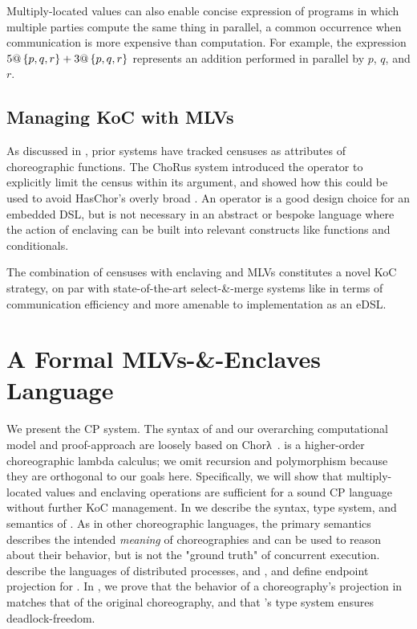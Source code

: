 Multiply-located values can also enable concise expression of programs in which multiple parties compute the same thing in parallel,
a common occurrence when communication is more expensive than computation.
For example, the \HLSCentral expression $5@\left\{p,q,r\right\}+3@\left\{p,q,r\right\}$ represents an addition performed in parallel by $p$, $q$, and $r$.

\subsection{Managing KoC with MLVs}
\label{sec:enclaves}

As discussed in , prior systems have tracked censuses as attributes of choreographic functions.
The ChoRus system introduced the  operator to explicitly limit the census within its argument,
and showed how this could be used to avoid HasChor's overly broad .
An  operator is a good design choice for an embedded DSL,
but is not necessary in an abstract or bespoke language where the action of enclaving can be built into relevant constructs like
functions and conditionals.

The combination of censuses with enclaving and MLVs constitutes a novel KoC strategy,
on par with state-of-the-art select-\&-merge systems like \chorLambda in terms of communication efficiency
and more amenable to implementation as an eDSL.


\section{A Formal MLVs-\&-Enclaves Language}\label{sec:more-formalism}


We present the \HLSCentral CP system.
The syntax of \HLSCentral and our overarching computational model and proof-approach are loosely based on
Chorλ~\cite{chor-lambda}.
\HLSCentral is a higher-order choreographic lambda calculus;
we omit recursion and polymorphism because they are orthogonal to our goals here.
Specifically, we will show that multiply-located values and enclaving operations are sufficient for a sound
CP language without further KoC management.
In 
we describe the syntax, type system, and semantics of \HLSCentral.
As in other choreographic languages, the primary semantics describes the intended \emph{meaning} of choreographies
and can be used to reason about their behavior,
but is not the "ground truth" of concurrent execution.
 describe the languages of distributed processes,
\HLSLocal and \HLSNet,
and define endpoint projection for \HLSCentral.
%
In , we prove that the behavior of a choreography's projection in \HLSNet
matches that of the original \HLSCentral choreography, and that \HLSCentral's type system ensures deadlock-freedom.

